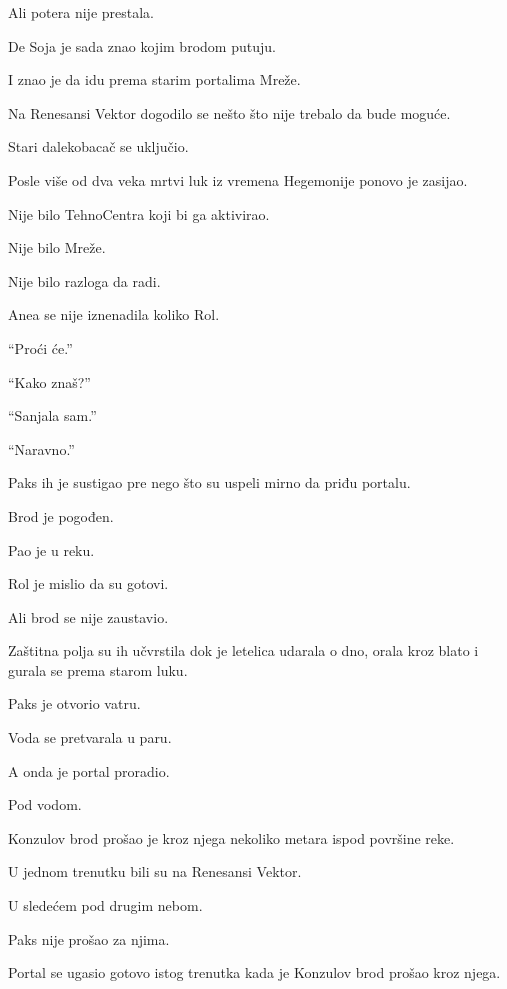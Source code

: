 Ali potera nije prestala.

De Soja je sada znao kojim brodom putuju.

I znao je da idu prema starim portalima Mreže.

\bigskip

Na Renesansi Vektor dogodilo se nešto što nije trebalo da bude moguće.

Stari dalekobacač se uključio.

\bigskip

Posle više od dva veka mrtvi luk iz vremena Hegemonije ponovo je zasijao.

Nije bilo TehnoCentra koji bi ga aktivirao.

Nije bilo Mreže.

Nije bilo razloga da radi.

\bigskip

Anea se nije iznenadila koliko Rol.

``Proći će.''

``Kako znaš?''

``Sanjala sam.''

``Naravno.''

\bigskip

Paks ih je sustigao pre nego što su uspeli mirno da priđu portalu.

Brod je pogođen.

Pao je u reku.

Rol je mislio da su gotovi.

Ali brod se nije zaustavio.

Zaštitna polja su ih učvrstila dok je letelica udarala o dno, orala kroz blato i gurala se prema starom luku.

Paks je otvorio vatru.

Voda se pretvarala u paru.

\bigskip

A onda je portal proradio.

Pod vodom.

\bigskip

Konzulov brod prošao je kroz njega nekoliko metara ispod površine reke.

U jednom trenutku bili su na Renesansi Vektor.

U sledećem pod drugim nebom.

\bigskip

Paks nije prošao za njima.

Portal se ugasio gotovo istog trenutka kada je Konzulov brod prošao kroz njega.


